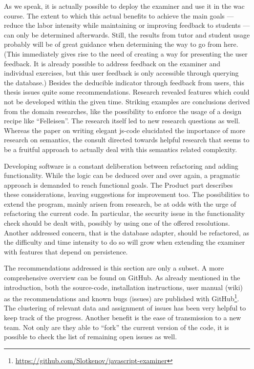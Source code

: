 As we speak, it is actually possible to deploy the \gls{examiner} and use it in 
the \gls{wac} course. The extent to which this actual benefits to achieve 
the main goals
--- reduce the labor intensity while maintaining or improving feedback to 
students --- can only be determined afterwards. Still, the results from 
\gls{tutor} and \gls{student} usage probably will be of great guidance when 
determining the way to go from here. (This immediately gives rise to the need of
creating a way for presenting the user feedback. It is already possible to
address feedback on the \gls{examiner} and individual \glspl{exercise},
but this user feedback is only accessible through querying the database.)
Besides the deducible indicator through feedback from users, this 
thesis issues quite some recommendations. Research revealed
features which could not be developed within the given time. Striking
examples are conclusions derived from the domain researches, like the possibility
to enforce the usage of a design recipe like ``Felleisen''. The research itself
led to new research questions as well. Whereas the paper on writing elegant
\gls{js-code} elucidated the importance of more research on semantics, the
consult directed towards helpful research that seems to be a fruitful approach
to actually deal with this semantics related complexity.

Developing software is a constant deliberation between refactoring and adding
functionality. While the logic can be deduced over and over again, a pragmatic
approach is demanded to reach functional goals. The Product part describes these
considerations, leaving suggestions for improvement too. The possibilities to
extend the program, mainly arisen from research, be at odds with the urge of
refactoring the current code. In particular, the security issue in the 
functionality check should be dealt with, possibly by using one of the offered
resolutions. Another addressed concern, that is the database adapter, should be
refactored, as the difficulty and time intensity to do so will grow when extending
the \gls{examiner} with features that depend on persistence.

The recommendations addressed is this section are only a subset. A more 
comprehensive overview can be found on GitHub. As already mentioned in the 
introduction, both the \gls{source-code}, 
installation instructions, user manual (wiki) as the recommendations and known 
bugs (issues) are published with 
GitHub\footnote{\url{https://github.com/Slotkenov/javascript-examiner}}. 
The clustering of relevant data and assignment
of issues has been very helpful to keep track of the progress. Another benefit 
is the ease of transmission to a new team. Not only are they able to ``fork'' 
the current version of the code, it is possible to check the list of 
remaining open issues as well.

